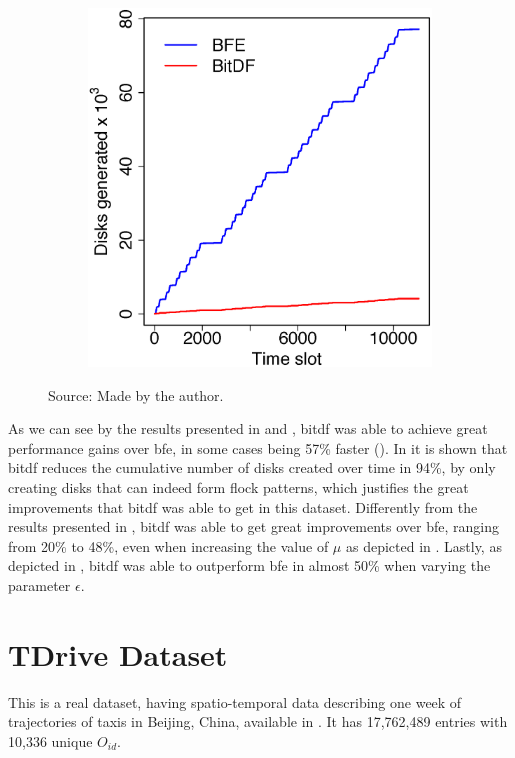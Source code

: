 {\begin{figure}[h!]
\begin{subfigure}[t]{0.48\textwidth}
        \includegraphics[width=\textwidth]{images/BerlinMOD_d.eps}
        \label{fig:berlinmod_disks}
    \end{subfigure}
    \footnotesize{Source: Made by the author.}
    \label{fig:berlinmod_results2}
\end{figure}

As we can see by the results presented in  and , \ac{bitdf}
was able to achieve great performance gains over \ac{bfe}, in some cases being 57\% faster
(). In  it is shown that \ac{bitdf} reduces the cumulative
number of disks created over time in 94\%, by only creating disks that can indeed form flock patterns, which justifies
the great improvements that \ac{bitdf} was able to get in this dataset. Differently from the results presented in
, \ac{bitdf} was able to get great improvements over \ac{bfe}, ranging from 20\% to 48\%, even when
increasing the value of $\mu$ as depicted in . Lastly, as depicted in
, \ac{bitdf} was able to outperform \ac{bfe} in almost 50\% when varying the parameter
$\epsilon$.

\section{TDrive Dataset}
\label{sec:tdrive}
This is a real dataset, having spatio-temporal data describing one week of trajectories of taxis in Beijing, China,
available in \cite{tdrive}. It has 17,762,489 entries with 10,336 unique $O_{id}$.

}
